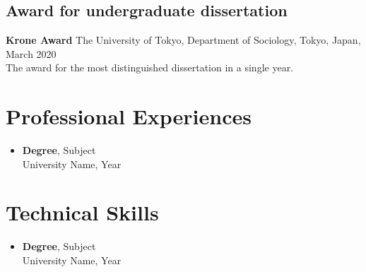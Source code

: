 \documentclass[11pt, a4paper]{article}
\begin{document}
\subsection*{Award for undergraduate dissertation}
\textbf{Krone Award}
The University of Tokyo, Department of Sociology, Tokyo, Japan, March 2020 \\
The award for the most distinguished dissertation in a single year.

\section*{Professional Experiences}
\begin{itemize}[leftmargin=*]
    \item \textbf{Degree}, Subject \\
    University Name, Year
\end{itemize}

\section*{Technical Skills}
\begin{itemize}[leftmargin=*]
    \item \textbf{Degree}, Subject \\
    University Name, Year
\end{itemize}
\end{document}

